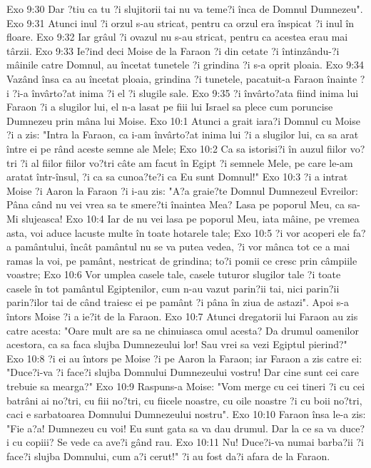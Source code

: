 Exo 9:30  Dar ?tiu ca tu ?i slujitorii tai nu va teme?i înca de Domnul Dumnezeu".
Exo 9:31  Atunci inul ?i orzul s-au stricat, pentru ca orzul era înspicat ?i inul în floare.
Exo 9:32  Iar grâul ?i ovazul nu s-au stricat, pentru ca acestea erau mai târzii.
Exo 9:33  Ie?ind deci Moise de la Faraon ?i din cetate ?i întinzându-?i mâinile catre Domnul, au încetat tunetele ?i grindina ?i s-a oprit ploaia.
Exo 9:34  Vazând însa ca au încetat ploaia, grindina ?i tunetele, pacatuit-a Faraon înainte ?i ?i-a învârto?at inima ?i el ?i slugile sale.
Exo 9:35  ?i învârto?ata fiind inima lui Faraon ?i a slugilor lui, el n-a lasat pe fiii lui Israel sa plece cum poruncise Dumnezeu prin mâna lui Moise.
Exo 10:1  Atunci a grait iara?i Domnul cu Moise ?i a zis: "Intra la Faraon, ca i-am învârto?at inima lui ?i a slugilor lui, ca sa arat între ei pe rând aceste semne ale Mele;
Exo 10:2  Ca sa istorisi?i în auzul fiilor vo?tri ?i al fiilor fiilor vo?tri câte am facut în Egipt ?i semnele Mele, pe care le-am aratat într-însul, ?i ca sa cunoa?te?i ca Eu sunt Domnul!"
Exo 10:3  ?i a intrat Moise ?i Aaron la Faraon ?i i-au zis: "A?a graie?te Domnul Dumnezeul Evreilor: Pâna când nu vei vrea sa te smere?ti înaintea Mea? Lasa pe poporul Meu, ca sa-Mi slujeasca!
Exo 10:4  Iar de nu vei lasa pe poporul Meu, iata mâine, pe vremea asta, voi aduce lacuste multe în toate hotarele tale;
Exo 10:5  ?i vor acoperi ele fa?a pamântului, încât pamântul nu se va putea vedea, ?i vor mânca tot ce a mai ramas la voi, pe pamânt, nestricat de grindina; to?i pomii ce cresc prin câmpiile voastre;
Exo 10:6  Vor umplea casele tale, casele tuturor slugilor tale ?i toate casele în tot pamântul Egiptenilor, cum n-au vazut parin?ii tai, nici parin?ii parin?ilor tai de când traiesc ei pe pamânt ?i pâna în ziua de astazi". Apoi s-a întors Moise ?i a ie?it de la Faraon.
Exo 10:7  Atunci dregatorii lui Faraon au zis catre acesta: "Oare mult are sa ne chinuiasca omul acesta? Da drumul oamenilor acestora, ca sa faca slujba Dumnezeului lor! Sau vrei sa vezi Egiptul pierind?"
Exo 10:8  ?i ei au întors pe Moise ?i pe Aaron la Faraon; iar Faraon a zis catre ei: "Duce?i-va ?i face?i slujba Domnului Dumnezeului vostru! Dar cine sunt cei care trebuie sa mearga?"
Exo 10:9  Raspuns-a Moise: "Vom merge cu cei tineri ?i cu cei batrâni ai no?tri, cu fiii no?tri, cu fiicele noastre, cu oile noastre ?i cu boii no?tri, caci e sarbatoarea Domnului Dumnezeului nostru".
Exo 10:10  Faraon însa le-a zis: "Fie a?a! Dumnezeu cu voi! Eu sunt gata sa va dau drumul. Dar la ce sa va duce?i cu copiii? Se vede ca ave?i gând rau.
Exo 10:11  Nu! Duce?i-va numai barba?ii ?i face?i slujba Domnului, cum a?i cerut!" ?i au fost da?i afara de la Faraon.
